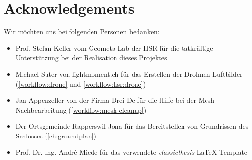 

\bigskip


\begingroup

\let\clearpage\relax
\let\cleardoublepage\relax
\let\cleardoublepage\relax

\chapter*{Acknowledgements} %

Wir möchten uns bei folgenden Personen bedanken:

\begin{itemize}
	\item Prof. Stefan Keller vom Geometa Lab der HSR für die tatkräftige
		Unterstützung bei der Realisation dieses Projektes
	\item Michael Suter von lightmoment.ch für das Erstellen der
		Drohnen-Luftbilder (\autoref{workflow:drone} und
		\autoref{workflow:hsr:drone})
	\item Jan Appenzeller von der Firma Drei-De für die Hilfe bei der
		Mesh-Nachbearbeitung (\autoref{workflow:mesh-cleanup})
	\item Der Ortsgemeinde Rapperswil-Jona für das Bereitstellen von Grundrissen
		des Schlosses (\autoref{ch:groundplan})
	\item Prof. Dr.-Ing. André Miede für das verwendete \emph{classicthesis}
		\LaTeX-Template
\end{itemize}


\endgroup
